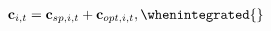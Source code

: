 \begin{equation}
  \begin{gathered}
    \begin{aligned}
      \mathbf{c}_{i,t} & = \mathbf{c}_{sp,i,t} + \mathbf{c}_{opt,i,t}, \whenintegrated{\label{eq:model}}
    \end{aligned}
  \end{gathered}
\end{equation}

